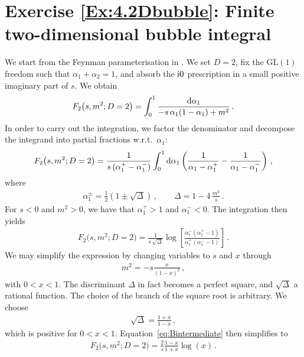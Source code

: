 \section*{Exercise \ref{Ex:4.2Dbubble}: Finite two-dimensional bubble integral}
\label{Sol:4.2Dbubble}
%
We start from the Feynman parameterisation in . We set $D=2$, fix the $\text{GL}(1)$ freedom such that $\alpha_1+\alpha_2=1$, and absorb the $\mathrm{i} 0$ prescription in a small positive imaginary part of $s$. We obtain
\begin{align}
F_2\bigl(s,m^2; D=2\bigr) = \int_0^1 \frac{\mathrm{d} \alpha_1}{-s \, \alpha_1 (1-\alpha_1 ) + m^2} \,.
\end{align}
In order to carry out the integration, we factor the denominator and decompose the integrand into partial fractions w.r.t.~$\alpha_1$:
\begin{align}
F_2\bigl(s,m^2; D=2\bigr) = \frac{1}{s \, (\alpha_1^+-\alpha_1^-)} \int_0^1 \mathrm{d} \alpha_1 \left( \frac{1}{\alpha_1 - \alpha_1^+} - \frac{1}{\alpha_1 - \alpha_1^-} \right) \,,
\end{align}
where
\begin{align}
\alpha_1^{\pm} = \frac{1}{2} \left( 1 \pm \sqrt{\Delta} \right) \,, \qquad \Delta = 1 - 4 \, \frac{m^2}{s} \,. 
\end{align}
For $s<0$ and $m^2>0$, we have that $\alpha_1^+ >1$ and $\alpha_1^-<0$. The integration then yields
\begin{align} \label{eq:Bintermediate}
F_2\bigl(s,m^2;D=2\bigr) = \frac{1}{s \, \sqrt{\Delta}} \log \left[ \frac{\alpha_1^- (\alpha_1^+-1)}{\alpha_1^+ (\alpha_1^--1)} \right] \,.
\end{align}
We may simplify the expression by changing variables to $s$ and $x$ through 
\begin{align} \label{eq:m2x}
m^2 = -s \frac{x}{(1-x)^2} \,,
\end{align}
with $0<x<1$. The discriminant $\Delta$ in fact becomes a perfect square, and $\sqrt{\Delta}$ a rational function. The choice of the branch of the square root is arbitrary. We choose
\begin{align} \label{eq:branch_choice}
\sqrt{\Delta} = \frac{1+x}{1-x} \,,
\end{align}
which is positive for $0<x<1$. Equation~\eqref{eq:Bintermediate} then simplifies to
\begin{align} \label{eq:Bintermediate2}
F_2\bigl(s,m^2;D=2\bigr) = \frac{2}{s} \frac{1-x}{1+x} \log(x) \,.
\end{align}

